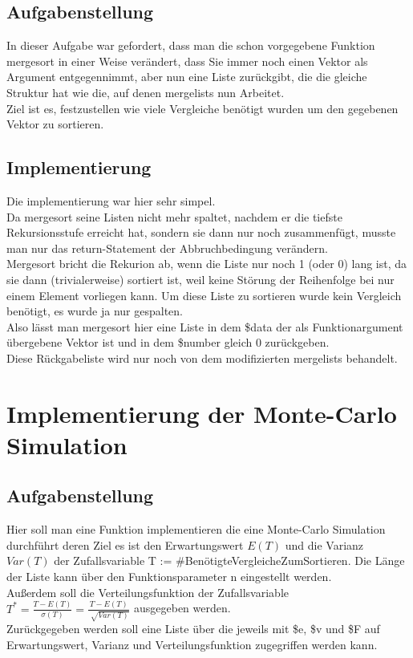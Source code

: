 \documentclass[a4paper, 10pt]{article}
\begin{document}
\subsection{Aufgabenstellung}
In dieser Aufgabe war gefordert, dass man die schon vorgegebene Funktion mergesort in einer Weise verändert, dass Sie immer noch einen Vektor als Argument entgegennimmt, aber nun eine Liste zurückgibt, die die gleiche Struktur hat wie die, auf denen mergelists nun Arbeitet. \\
Ziel ist es, festzustellen wie viele Vergleiche benötigt wurden um den gegebenen Vektor zu sortieren. \\
\subsection{Implementierung}
Die implementierung war hier sehr simpel.\\
Da mergesort seine Listen nicht mehr spaltet, nachdem er die tiefste Rekursionsstufe erreicht hat, sondern sie dann nur noch zusammenfügt, musste man nur das return-Statement der Abbruchbedingung verändern. \\
Mergesort bricht die Rekurion ab, wenn die Liste nur noch 1 (oder 0) lang ist, da sie dann (trivialerweise) sortiert ist, weil keine Störung der Reihenfolge bei nur einem Element vorliegen kann. Um diese Liste zu sortieren wurde kein Vergleich benötigt, es wurde ja nur gespalten. \\
Also lässt man mergesort hier eine Liste in dem \$data der als Funktionargument übergebene Vektor ist  und in dem \$number  gleich 0 zurückgeben.\\
Diese Rückgabeliste wird nur noch von dem modifizierten mergelists behandelt.
\section{Implementierung der Monte-Carlo Simulation}
\subsection{Aufgabenstellung}
Hier soll man eine Funktion implementieren die eine Monte-Carlo Simulation durchführt deren Ziel es ist den Erwartungswert $E(T)$ und die Varianz $Var(T)$ der Zufallsvariable T := \#BenötigteVergleicheZumSortieren. Die Länge der Liste kann über den Funktionsparameter n eingestellt werden.\\
Außerdem soll die Verteilungsfunktion der Zufallsvariable $T^* = \frac{T - E(T)}{\sigma(T)} = \frac{T - E(T)}{\sqrt[]{Var(T)}}$ ausgegeben werden.\\
Zurückgegeben werden soll eine Liste über die jeweils mit  \$e, \$v und \$F  auf Erwartungswert, Varianz und Verteilungsfunktion zugegriffen werden kann.
\end{document}
